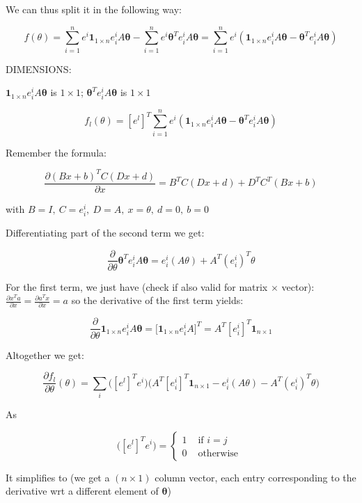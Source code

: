 \documentclass[12pt]{article}
\newcommand\ddfrac[2]{\frac{\displaystyle #1}{\displaystyle #2}}
\begin{document}
We can thus split it in the following way:

\[ f(\theta)= \sum_{i=1}^{n} e^i \bm{1}_{1 \times n} e_i^i A \bm{\theta} - \sum_{i=1}^{n} e^i \bm{\theta} ^T e_i^i A \bm{\theta} =  
\sum_{i=1}^{n} e^i \left(  \bm{1}_{1 \times n} e_i^i A \bm{\theta} - \bm{\theta} ^T e_i^i A \bm{\theta} \right) \]

DIMENSIONS:

$\bm{1}_{1 \times n} e_i^i A \bm{\theta}$ is $1 \times 1$; $\bm{\theta} ^T e_i^i A \bm{\theta}$ is $1 \times 1$

\[
 f_l(\theta) = \left[ e^l\right]^T \sum_{i=1}^{n} e^i  \left(  \bm{1}_{1 \times n} e_i^i A \bm{\theta} - \bm{\theta} ^T e_i^i A \bm{\theta} \right)  \] 

Remember the formula:

\[ \ddfrac{\partial (Bx+b)^T C (Dx+d)}{\partial x} = B^T C (Dx+d) + D^T C^T (Bx+b) \] 

with $B=I, \ C=e^i_i, \  D=A, \ x=\theta, \ d=0, \ b=0$

Differentiating part of the second term we get:

\[ \ddfrac{\partial}{\partial \theta} \bm{\theta} ^T e_i^i A \bm{\theta} = e^i_i (A \theta) + A^T (e_i^i)^T \theta \]


For the first term, we just have (check if also valid for matrix $\times$ vector): $\frac{\partial  x^T a}{\partial x} = \frac{\partial a^T x }{\partial x} = a$ so the derivative of the first term yields:

\[ \ddfrac{\partial}{\partial \theta} \bm{1}_{1 \times n} e_i^i A \bm{\theta}=  \Big[ \bm{1}_{1 \times n} e_i^i A \Big]^T = A^T \left[ e_i^i \right]^T \bm{1}_{n \times 1}  \]

Altogether we get:

 \[ \ddfrac{\partial f_l}{\partial \theta} (\theta) = \sum_i \Big(\left[ e^l \right]^T e^i \Big) \Bigg( A^T \left[ e_i^i \right]^T \bm{1}_{n \times 1}   -  e^i_i (A \theta) - A^T (e_i^i)^T \theta \Bigg) \]

As 

\[ \Big(\left[ e^l \right]^T e^i \Big) = \left\{ \begin{array}{ll} 1 & \text{ if } i=j \\ 0 & \text{ otherwise } \end{array} \right. \]

It simplifies to (we get a $(n \times 1)$ column vector, each entry corresponding to the derivative wrt a different element of $\bm{\theta}$)
\end{document}
